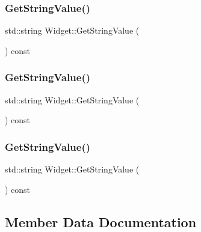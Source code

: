 \mbox{\label{class_widget_a7a6e3a7fca3a9373f631c94dc1494d22}} 
\subsubsection{\texorpdfstring{GetStringValue()}{GetStringValue()}\hspace{0.1cm}{\footnotesize\ttfamily [1/3]}}
{\footnotesize\ttfamily std\+::string Widget\+::\+Get\+String\+Value (\begin{DoxyParamCaption}{ }\end{DoxyParamCaption}) const}

\mbox{\label{class_widget_a7a6e3a7fca3a9373f631c94dc1494d22}} 
\subsubsection{\texorpdfstring{GetStringValue()}{GetStringValue()}\hspace{0.1cm}{\footnotesize\ttfamily [2/3]}}
{\footnotesize\ttfamily std\+::string Widget\+::\+Get\+String\+Value (\begin{DoxyParamCaption}{ }\end{DoxyParamCaption}) const}

\mbox{\label{class_widget_a7a6e3a7fca3a9373f631c94dc1494d22}} 
\subsubsection{\texorpdfstring{GetStringValue()}{GetStringValue()}\hspace{0.1cm}{\footnotesize\ttfamily [3/3]}}
{\footnotesize\ttfamily std\+::string Widget\+::\+Get\+String\+Value (\begin{DoxyParamCaption}{ }\end{DoxyParamCaption}) const}



\subsection{Member Data Documentation}
\mbox{\label{class_widget_a1d2f74810f3f912270a681e0671a7a55}} 
